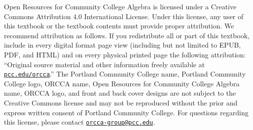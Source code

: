 \documentclass[twoside,10pt,]{book}
\numberwithin{equation}{section}
\begin{document}
Open Resources for Community College Algebra is licensed under a Creative Commons Attribution 4.0 International License. Under this license, any user of this textbook or the textbook contents must provide proper attribution. We recommend attribution as follows. If you redistribute all or part of this textbook, include in every digital format page view (including but not limited to EPUB, PDF, and HTML) and on every physical printed page the following attribution: ``Original source material and other information freely available at \href{https://www.pcc.edu/orcca}{\nolinkurl{pcc.edu/orcca}}.'' The Portland Community College name, Portland Community College logo, ORCCA name, Open Resources for Community College Algebra name, ORCCA logo, and front and back cover designs are not subject to the Creative Commons license and may not be reproduced without the prior and express written consent of Portland Community College. For questions regarding this license, please contact \href{mailto:orcca-group@pcc.edu}{\nolinkurl{orcca-group@pcc.edu}}.\par\medskip
{}
\null\clearpage
%
%
\typeout{************************************************}
\typeout{************************************************}
%
\end{document}
